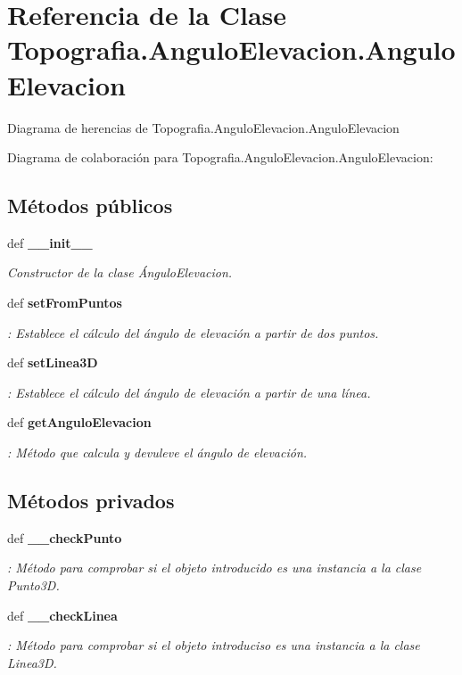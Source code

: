 \section{Referencia de la Clase Topografia.\-Angulo\-Elevacion.\-Angulo\-Elevacion}
\label{classTopografia_1_1AnguloElevacion_1_1AnguloElevacion}


Diagrama de herencias de Topografia.\-Angulo\-Elevacion.\-Angulo\-Elevacion


Diagrama de colaboración para Topografia.\-Angulo\-Elevacion.\-Angulo\-Elevacion\-:
\subsection*{Métodos públicos}
\begin{DoxyCompactItemize}
\item 
def {\bf \-\_\-\-\_\-init\-\_\-\-\_\-}
\begin{DoxyCompactList}\small\item\em Constructor de la clase Ángulo\-Elevacion. \end{DoxyCompactList}\item 
def {\bf set\-From\-Puntos}
\begin{DoxyCompactList}\small\item\em \-: Establece el cálculo del ángulo de elevación a partir de dos puntos. \end{DoxyCompactList}\item 
def {\bf set\-Linea3\-D}
\begin{DoxyCompactList}\small\item\em \-: Establece el cálculo del ángulo de elevación a partir de una línea. \end{DoxyCompactList}\item 
def {\bf get\-Angulo\-Elevacion}
\begin{DoxyCompactList}\small\item\em \-: Método que calcula y devuleve el ángulo de elevación. \end{DoxyCompactList}\end{DoxyCompactItemize}
\subsection*{Métodos privados}
\begin{DoxyCompactItemize}
\item 
def {\bf \-\_\-\-\_\-check\-Punto}
\begin{DoxyCompactList}\small\item\em \-: Método para comprobar si el objeto introducido es una instancia a la clase Punto3\-D. \end{DoxyCompactList}\item 
def {\bf \-\_\-\-\_\-check\-Linea}
\begin{DoxyCompactList}\small\item\em \-: Método para comprobar si el objeto introduciso es una instancia a la clase Linea3\-D. \end{DoxyCompactList}\end{DoxyCompactItemize}
